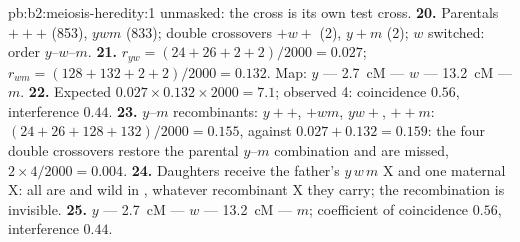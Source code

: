 \begin{solution}{pb:b2:meiosis-heredity:1}
unmasked: the cross is its own test cross.
\textbf{20.} Parentals $+++$ (853), $ywm$ (833); double crossovers
$+w+$ (2), $y+m$ (2); $w$ switched: order $y$--$w$--$m$.
\textbf{21.} $r_{yw} = (24 + 26 + 2 + 2)/2000 = 0.027$; $r_{wm} = (128
+ 132 + 2 + 2)/2000 = 0.132$. Map: $y$ --- \qty{2.7}{cM} --- $w$ ---
\qty{13.2}{cM} --- $m$.
\textbf{22.} Expected $0.027\times 0.132\times 2000 = 7.1$; observed
4: coincidence $0.56$, interference $0.44$.
\textbf{23.} $y$--$m$ recombinants: $y++$, $+wm$, $yw+$, $++m$: $(24 +
26 + 128 + 132)/2000 = 0.155$, against $0.027 + 0.132 = 0.159$: the
four double crossovers restore the parental $y$--$m$ combination and
are missed, $2\times 4/2000 = 0.004$.
\textbf{24.} Daughters receive the father's $y\,w\,m$ X and one
maternal X: all are  and wild in , whatever
recombinant X they carry; the recombination is invisible.
\textbf{25.} $y$ --- \qty{2.7}{cM} --- $w$ --- \qty{13.2}{cM} --- $m$;
coefficient of coincidence $0.56$, interference $0.44$.
\end{solution}

